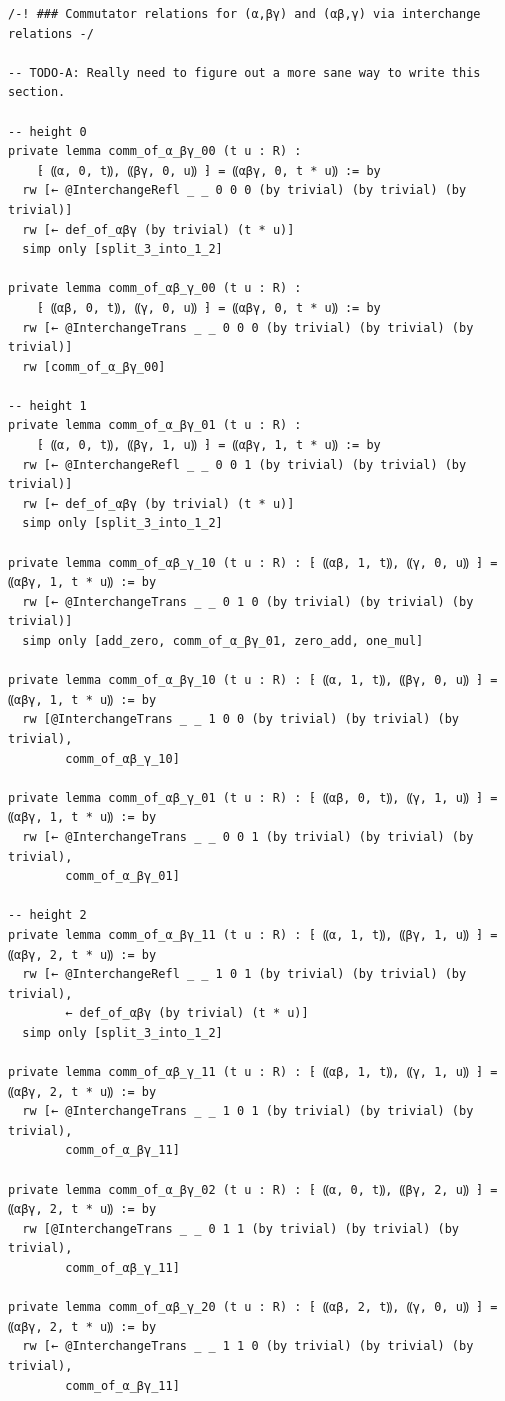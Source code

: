 \begin{Verbatim}
/-! ### Commutator relations for (α,βγ) and (αβ,γ) via interchange relations -/

-- TODO-A: Really need to figure out a more sane way to write this section.

-- height 0
private lemma comm_of_α_βγ_00 (t u : R) :
    ⁅ ⸨α, 0, t⸩, ⸨βγ, 0, u⸩ ⁆ = ⸨αβγ, 0, t * u⸩ := by
  rw [← @InterchangeRefl _ _ 0 0 0 (by trivial) (by trivial) (by trivial)]
  rw [← def_of_αβγ (by trivial) (t * u)]
  simp only [split_3_into_1_2]

private lemma comm_of_αβ_γ_00 (t u : R) :
    ⁅ ⸨αβ, 0, t⸩, ⸨γ, 0, u⸩ ⁆ = ⸨αβγ, 0, t * u⸩ := by
  rw [← @InterchangeTrans _ _ 0 0 0 (by trivial) (by trivial) (by trivial)]
  rw [comm_of_α_βγ_00]

-- height 1
private lemma comm_of_α_βγ_01 (t u : R) :
    ⁅ ⸨α, 0, t⸩, ⸨βγ, 1, u⸩ ⁆ = ⸨αβγ, 1, t * u⸩ := by
  rw [← @InterchangeRefl _ _ 0 0 1 (by trivial) (by trivial) (by trivial)]
  rw [← def_of_αβγ (by trivial) (t * u)]
  simp only [split_3_into_1_2]

private lemma comm_of_αβ_γ_10 (t u : R) : ⁅ ⸨αβ, 1, t⸩, ⸨γ, 0, u⸩ ⁆ = ⸨αβγ, 1, t * u⸩ := by
  rw [← @InterchangeTrans _ _ 0 1 0 (by trivial) (by trivial) (by trivial)]
  simp only [add_zero, comm_of_α_βγ_01, zero_add, one_mul]

private lemma comm_of_α_βγ_10 (t u : R) : ⁅ ⸨α, 1, t⸩, ⸨βγ, 0, u⸩ ⁆ = ⸨αβγ, 1, t * u⸩ := by
  rw [@InterchangeTrans _ _ 1 0 0 (by trivial) (by trivial) (by trivial),
        comm_of_αβ_γ_10]

private lemma comm_of_αβ_γ_01 (t u : R) : ⁅ ⸨αβ, 0, t⸩, ⸨γ, 1, u⸩ ⁆ = ⸨αβγ, 1, t * u⸩ := by
  rw [← @InterchangeTrans _ _ 0 0 1 (by trivial) (by trivial) (by trivial),
        comm_of_α_βγ_01]

-- height 2
private lemma comm_of_α_βγ_11 (t u : R) : ⁅ ⸨α, 1, t⸩, ⸨βγ, 1, u⸩ ⁆ = ⸨αβγ, 2, t * u⸩ := by
  rw [← @InterchangeRefl _ _ 1 0 1 (by trivial) (by trivial) (by trivial),
        ← def_of_αβγ (by trivial) (t * u)]
  simp only [split_3_into_1_2]

private lemma comm_of_αβ_γ_11 (t u : R) : ⁅ ⸨αβ, 1, t⸩, ⸨γ, 1, u⸩ ⁆ = ⸨αβγ, 2, t * u⸩ := by
  rw [← @InterchangeTrans _ _ 1 0 1 (by trivial) (by trivial) (by trivial),
        comm_of_α_βγ_11]

private lemma comm_of_α_βγ_02 (t u : R) : ⁅ ⸨α, 0, t⸩, ⸨βγ, 2, u⸩ ⁆ = ⸨αβγ, 2, t * u⸩ := by
  rw [@InterchangeTrans _ _ 0 1 1 (by trivial) (by trivial) (by trivial),
        comm_of_αβ_γ_11]

private lemma comm_of_αβ_γ_20 (t u : R) : ⁅ ⸨αβ, 2, t⸩, ⸨γ, 0, u⸩ ⁆ = ⸨αβγ, 2, t * u⸩ := by
  rw [← @InterchangeTrans _ _ 1 1 0 (by trivial) (by trivial) (by trivial),
        comm_of_α_βγ_11]


\end{Verbatim}
